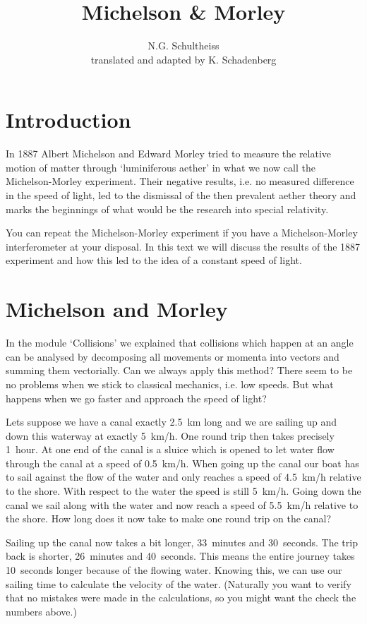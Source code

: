 \documentclass[12pt,a4paper]{article}
\author{N.G. Schultheiss \\ translated and adapted by K. Schadenberg}
\date{}
\title{Michelson \& Morley}
\numberwithin{equation}{section}
\numberwithin{figure}{section}
\numberwithin{table}{section}
\begin{document}
\maketitle

\section{Introduction}
In 1887 Albert Michelson and Edward Morley tried to measure the relative motion of matter through `luminiferous aether' in what we now call the Michelson-Morley experiment. Their negative results, i.e. no measured difference in the speed of light, led to the dismissal of the then prevalent aether theory and marks the beginnings of what would be the research into special relativity.

You can repeat the Michelson-Morley experiment if you have a Michelson-Morley interferometer at your disposal. In this text we will discuss the results of the 1887 experiment and how this led to the idea of a constant speed of light.

\section{Michelson and Morley}
In the module `Collisions' we explained that collisions which happen at an angle can be analysed by decomposing all movements or momenta into vectors and summing them vectorially. Can we always apply this method? There seem to be no problems when we stick to classical mechanics, i.e. low speeds. But what happens when we go faster and approach the speed of light?

Lets suppose we have a canal exactly 2.5~km long and we are sailing up and down this waterway at exactly 5~km/h. One round trip then takes precisely 1~hour. At one end of the canal is a sluice which is opened to let water flow through the canal at a speed of 0.5~km/h. When going up the canal our boat has to sail against the flow of the water and only reaches a speed of 4.5~km/h relative to the shore. With respect to the water the speed is still 5~km/h. Going down the canal we sail along with the water and now reach a speed of 5.5~km/h relative to the shore. How long does it now take to make one round trip on the canal?

Sailing up the canal now takes a bit longer, 33~minutes and 30~seconds. The trip back is shorter, 26~minutes and 40~seconds. This means the entire journey takes 10~seconds longer because of the flowing water. Knowing this, we can use our sailing time to calculate the velocity of the water. (Naturally you want to verify that no mistakes were made in the calculations, so you might want the check the numbers above.)
\end{document}
